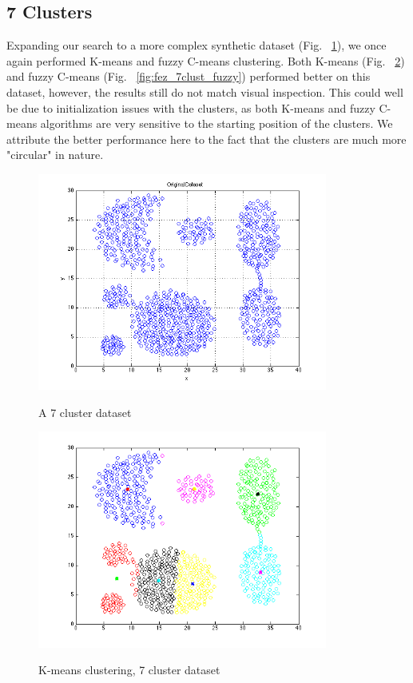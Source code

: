 \documentclass{article}
\begin{document}
\subsection*{7 Clusters}
Expanding our search to a more complex synthetic dataset (Fig. ~\ref{fig:fez_7clust_base}),
we once again performed K-means and fuzzy C-means clustering. Both K-means (Fig. ~\ref{fig:fez_7clust_kmeans}) 
and fuzzy C-means (Fig. ~\ref{fig:fez_7clust_fuzzy}) performed better on this dataset, however, the results
still do not match visual inspection. This could well be due to initialization issues with the clusters, as both 
K-means and fuzzy C-means algorithms are very sensitive to the starting position of the clusters. We attribute
the better performance here to the fact that the clusters are much more "circular" in nature.

\begin{figure}[h!]
  \caption{A 7 cluster dataset}
  \centering
    \includegraphics[width=0.85\textwidth]{fez_7clust_base.png}
  \label{fig:fez_7clust_base}
\end{figure}

\begin{figure}[h!]
  \caption{K-means clustering, 7 cluster dataset}
  \centering
    \includegraphics[width=0.85\textwidth]{fez_7clust_kmeans.png}
  \label{fig:fez_7clust_kmeans}
\end{figure}
\end{document}

